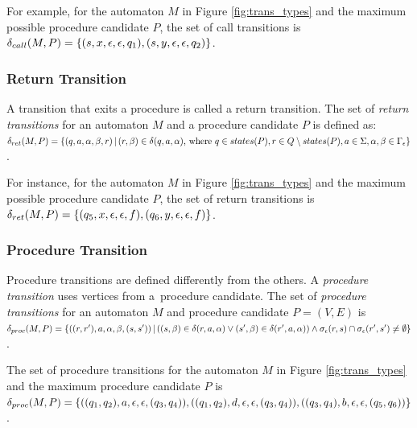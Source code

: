             For example, for the automaton $M$ in Figure \ref{fig:trans_types} and the maximum possible procedure candidate $P$, the set of call transitions is $\delta_{call}(M, P) = \{(s, x, \epsilon, \epsilon, q_1), (s, y,\\ \epsilon, \epsilon, q_2)\}$.

        \subsubsection*{Return Transition}
            A transition that exits a procedure is called a return transition. The set of \textit{return transitions} for an automaton $M$ and a procedure candidate $P$ is defined as: $\delta_{ret}(M, P) = \{(q, a, \alpha, \beta ,r)\,|\,(r, \beta) \in \delta(q, a, \alpha)\textnormal{, where }\\q \in states(P), r \in Q \setminus states(P), a \in \Sigma, \alpha, \beta \in \Gamma_\epsilon\}$.

            For instance, for the automaton $M$ in Figure \ref{fig:trans_types} and the maximum possible procedure candidate $P$, the set of return transitions is $\delta_{ret}(M, P) = \{(q_5, x, \epsilon, \epsilon, f), (q_6,\\ y, \epsilon, \epsilon, f)\}$.

        \subsubsection*{Procedure Transition}
            Procedure transitions are defined differently from the others. A \textit{procedure transition} uses vertices from a~procedure candidate. The set of \textit{procedure transitions} for an automaton $M$ and procedure candidate $P = (V, E)$ is $\delta_{proc}(M, P) = \{((r, r'), a, \alpha, \beta, (s, s')) \,|\,((s, \beta) \in \delta(r, a,\\ \alpha) \lor (s', \beta) \in \delta(r', a, \alpha)) \land \sigma_\epsilon(r, s) \cap \sigma_\epsilon(r', s') \neq \emptyset\}$.

            The set of procedure transitions for the automaton $M$ in Figure \ref{fig:trans_types} and the maximum procedure candidate $P$ is $\delta_{proc}(M, P) = \{((q_1, q_2), a, \epsilon, \epsilon, (q_3, q_4)), ((q_1, q_2),\\ d, \epsilon, \epsilon, (q_3, q_4)), ((q_3, q_4), b, \epsilon, \epsilon, (q_5, q_6))\}$.

